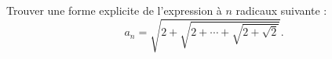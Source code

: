 Trouver une forme explicite de l'expression à $n$ radicaux suivante :
\[ a_n = \sqrt{2 + \sqrt{2 + \cdots + \sqrt{2 + \sqrt{2}}}}. \]
